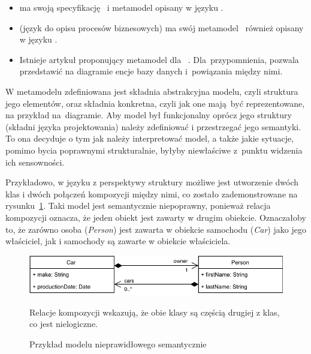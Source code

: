 \begin{itemize}
	\item {} ma swoją specyfikację~\cite{uml-omg-specification}
	      i metamodel opisany w języku .

	\item {} (język do opisu procesów biznesowych) ma swój
	      metamodel~\cite{bpmn-omg-specification} również opisany w języku .

	\item Istnieje artykuł proponujący metamodel dla ~\cite{entity-relationship-metamodel}. Dla~przypomnienia,  pozwala przedstawić na diagramie encje bazy danych i~powiązania między nimi.
\end{itemize}

W metamodelu zdefiniowana jest składnia abstrakcyjna modelu, czyli struktura
jego elementów, oraz składnia konkretna, czyli jak one mają być reprezentowane,
na przykład na~diagramie.
Aby model był funkcjonalny oprócz jego struktury (składni języka projektowania)
należy zdefiniować i przestrzegać jego semantyki. To ona decyduje o tym jak
należy interpretować model, a także jakie sytuacje, pomimo bycia poprawnymi
strukturalnie, byłyby niewłaściwe z~punktu widzenia ich sensowności.

Przykładowo, w języku  z perspektywy struktury możliwe jest
utworzenie dwóch klas i dwóch połączeń kompozycji między nimi, co zostało
zademonstrowane na rysunku~\ref{rys:nieprawidlowy-model-uml}. Taki model jest
semantycznie niepoprawny, ponieważ relacja kompozycji oznacza, że jeden obiekt
jest zawarty w drugim obiekcie. Oznaczałoby to, że zarówno osoba
(\emph{Person}) jest zawarta w obiekcie samochodu (\emph{Car}) jako jego
właściciel, jak i samochody są zawarte w obiekcie właściciela.

\begin{figure}[!hb]
	\centering

	\includegraphics[width=0.95\linewidth]{./images/invalid-uml-example.pdf}
	\caption{Przykład modelu  nieprawidłowego
		semantycznie}\label{rys:nieprawidlowy-model-uml}
	\medskip
	{\small Relacje kompozycji wskazują, że obie klasy są częścią drugiej z
		klas, co jest nielogiczne.}
\end{figure}

